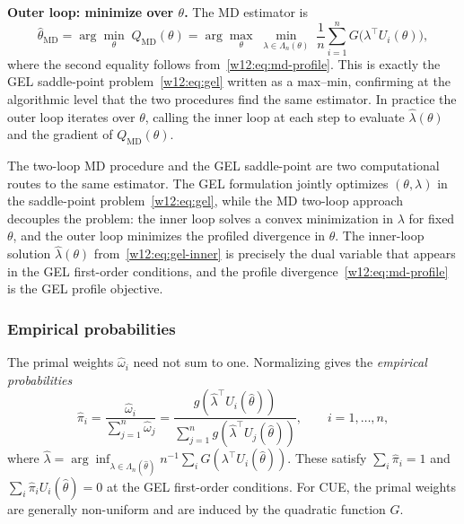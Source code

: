 \documentclass[master.tex]{subfiles}
\begin{document}
\textbf{Outer loop: minimize over $\theta$.}  The MD estimator is
\[
  \hat\theta_{\mathrm{MD}}
  = \arg\min_{\theta}\; Q_{\mathrm{MD}}(\theta)
  = \arg\max_{\theta}\;
    \min_{\lambda \in \Lambda_n(\theta)}\;
    \frac{1}{n}\sum_{i=1}^n G\!\bigl(\lambda^\top U_i(\theta)\bigr),
\]
where the second equality follows from~\eqref{w12:eq:md-profile}.
This is exactly the GEL saddle-point problem~\eqref{w12:eq:gel}
written as a max--min, confirming at the algorithmic level that the
two procedures find the same estimator.  In practice the outer loop
iterates over $\theta$, calling the inner loop at each step to
evaluate $\hat\lambda(\theta)$ and the gradient of
$Q_{\mathrm{MD}}(\theta)$.

\begin{remark}
The two-loop MD procedure and the GEL saddle-point are two
computational routes to the same estimator.  The GEL formulation
jointly optimizes $(\theta, \lambda)$ in the saddle-point
problem~\eqref{w12:eq:gel}, while the MD two-loop approach decouples
the problem: the inner loop solves a convex minimization in $\lambda$
for fixed $\theta$, and the outer loop minimizes the profiled
divergence in $\theta$.  The inner-loop solution $\hat\lambda(\theta)$
from~\eqref{w12:eq:gel-inner} is precisely the dual variable that
appears in the GEL first-order conditions, and the profile
divergence~\eqref{w12:eq:md-profile} is the GEL profile objective.
\end{remark}

\subsubsection*{Empirical probabilities}

The primal weights $\hat\omega_i$ need not sum to one.  Normalizing
gives the \emph{empirical probabilities}
\begin{equation}
  \hat\pi_i
  = \frac{\hat\omega_i}{\sum_{j=1}^n \hat\omega_j}
  = \frac{g\!\left(\hat\lambda^\top U_i(\hat\theta)\right)}
         {\displaystyle\sum_{j=1}^n
          g\!\left(\hat\lambda^\top U_j(\hat\theta)\right)},
  \qquad i = 1,\ldots,n,
  \label{w12:eq:gel-probs}
\end{equation}
where $\hat\lambda =
\arg\inf_{\lambda \in \Lambda_n(\hat\theta)}
n^{-1}\sum_i G(\lambda^\top U_i(\hat\theta))$.
These satisfy $\sum_i \hat\pi_i = 1$ and $\sum_i \hat\pi_i
U_i(\hat\theta) = 0$ at the GEL first-order conditions.  For CUE,
the primal weights are generally non-uniform and are induced by the
quadratic function $G$.
\end{document}
